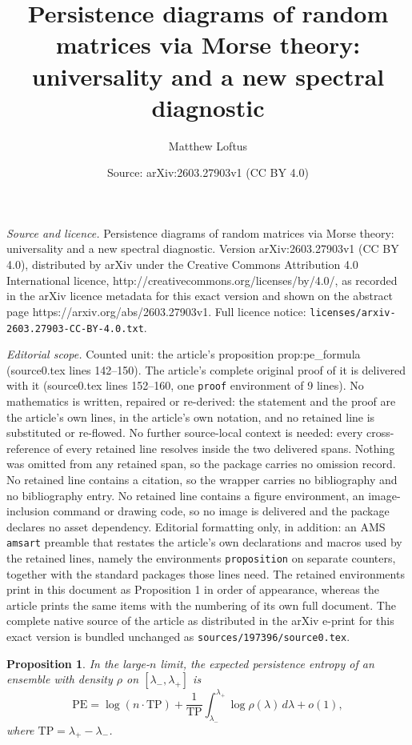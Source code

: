 \documentclass[10pt,a4paper]{amsart}
\title{Persistence diagrams of random matrices via Morse theory: universality and a new spectral diagnostic}
\author{Matthew Loftus}
\date{Source: arXiv:2603.27903v1 (CC BY 4.0)}
\newtheorem{proposition}{Proposition}
\begin{document}
\maketitle

\noindent\emph{Source and licence.} Persistence diagrams of random matrices via Morse theory: universality and a new spectral diagnostic. Version arXiv:2603.27903v1 (CC BY 4.0), distributed by arXiv under the Creative Commons Attribution 4.0 International licence, http://creativecommons.org/licenses/by/4.0/, as recorded in the arXiv licence metadata for this exact version and shown on the abstract page https://arxiv.org/abs/2603.27903v1. Full licence notice: \texttt{licenses/arxiv-2603.27903-CC-BY-4.0.txt}.\par\smallskip

\noindent\textit{Editorial scope.} Counted unit: the article's proposition prop:pe\_formula (source0.tex lines 142--150). The article's complete original proof of it is delivered with it (source0.tex lines 152--160, one \texttt{proof} environment of 9 lines). No mathematics is written, repaired or re-derived: the statement and the proof are the article's own lines, in the article's own notation, and no retained line is substituted or re-flowed.  No further source-local context is needed: every cross-reference of every retained line resolves inside the two delivered spans.  Nothing was omitted from any retained span, so the package carries no omission record.  No retained line contains a citation, so the wrapper carries no bibliography and no bibliography entry.  No retained line contains a figure environment, an image-inclusion command or drawing code, so no image is delivered and the package declares no asset dependency.  Editorial formatting only, in addition: an AMS \texttt{amsart} preamble that restates the article's own declarations and macros used by the retained lines, namely the environments \texttt{proposition} on separate counters, together with the standard packages those lines need.  The retained environments print in this document as Proposition 1 in order of appearance, whereas the article prints the same items with the numbering of its own full document.  The complete native source of the article as distributed in the arXiv e-print for this exact version is bundled unchanged as \texttt{sources/197396/source0.tex}.
\begin{proposition}
\label{prop:pe_formula}
In the large-$n$ limit, the expected persistence entropy of an ensemble with density $\rho$ on $[\lambda_-, \lambda_+]$ is
\begin{equation}
\mathrm{PE} = \log(n \cdot \mathrm{TP}) + \frac{1}{\mathrm{TP}} \int_{\lambda_-}^{\lambda_+} \log \rho(\lambda)\, d\lambda + o(1),
\label{eq:pe_general}
\end{equation}
where $\mathrm{TP} = \lambda_+ - \lambda_-$.
\end{proposition}
\end{document}
